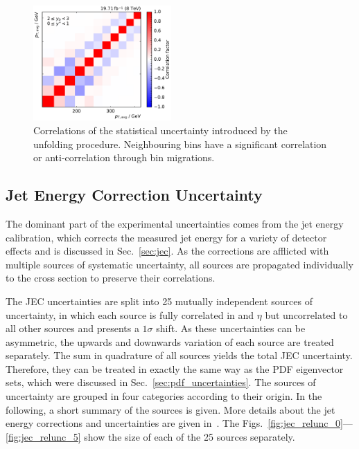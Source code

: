 \begin{figure}[htbp]
    \includegraphics[width=0.47\textwidth]{figures/measurement/unf_nlo_corr_yb2ys0.pdf}
    \caption[Correlations of statistical uncertainty]{Correlations of the
        statistical uncertainty introduced by the unfolding procedure.
        Neighbouring bins have a significant correlation or anti-correlation
        through bin migrations.}
    \label{fig:corr_unfolding_nlo}
\end{figure}

\subsection{Jet Energy Correction Uncertainty}

The dominant part of the experimental uncertainties comes from the jet energy
calibration, which corrects the measured jet energy for a variety of detector
effects and is discussed in Sec.~\ref{sec:jec}. As the corrections are afflicted
with multiple sources of systematic uncertainty, all sources are propagated
individually to the cross section to preserve their correlations.

The JEC uncertainties are split into 25 mutually independent sources of
uncertainty, in which each source is fully correlated in \pt and $\eta$
but uncorrelated to all other sources and presents a $1\sigma$
shift. As these uncertainties can be asymmetric, the upwards and downwards
variation of each source are treated separately. The sum in quadrature of all
sources yields the total JEC uncertainty. Therefore, they can be treated
in exactly the same way as the PDF eigenvector sets, which were discussed in
Sec.~\ref{sec:pdf_uncertainties}. The sources of uncertainty are grouped in four
categories according to their origin. In the following, a short summary of the
sources is given. More details about the jet energy corrections and
uncertainties are given in~\cite{jec_paper}. The
Figs.~\ref{fig:jec_relunc_0}---\ref{fig:jec_relunc_5} show the size of each of
the 25 sources separately.

